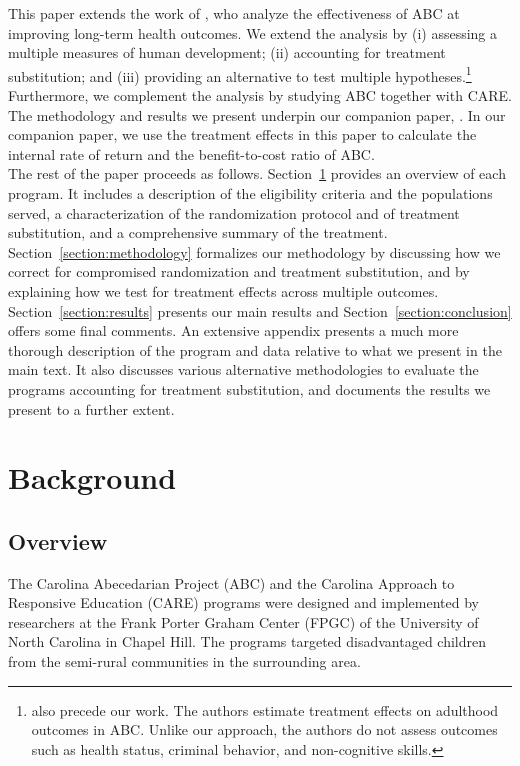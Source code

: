 \noindent This paper extends the work of \citet{Campbell_Conti_etal_2014_EarlyChildhoodInvestments}, who analyze the effectiveness of ABC at improving long-term health outcomes. We extend the analysis by (i) assessing a multiple measures of human development; (ii) accounting for treatment substitution; and (iii) providing an alternative to test multiple hypotheses.\footnote{\cite{Campbell_Pungello_etal_2012_DP} also precede our work. The authors estimate treatment effects on adulthood outcomes in ABC. Unlike our approach, the authors do not assess outcomes such as health status, criminal behavior, and non-cognitive skills.} Furthermore, we complement the analysis by studying ABC together with CARE. The methodology and results we present underpin our companion paper, \citet{Elango_et_al_2015_ABC_unpublished}. In our companion paper, we use the treatment effects in this paper to calculate the internal rate of return and the benefit-to-cost ratio of ABC.\\

\noindent The rest of the paper proceeds as follows. Section~\ref{section:background} provides an overview of each program. It includes a description of the eligibility criteria and the populations served, a characterization of the randomization protocol and of treatment substitution, and a comprehensive summary of the treatment. Section~\ref{section:methodology} formalizes our methodology by discussing how we correct for compromised randomization and treatment substitution, and  by explaining how we test for treatment effects across multiple outcomes. Section~\ref{section:results} presents our main results and Section~\ref{section:conclusion} offers some final comments. An extensive appendix presents a much more thorough description of the program and data relative to what we present in the main text. It also discusses various alternative methodologies to evaluate the programs accounting for treatment substitution, and documents the results we present to a further extent.

\section{Background} \label{section:background}
\subsection{Overview}

\noindent The Carolina Abecedarian Project (ABC) and the Carolina Approach to Responsive Education (CARE) programs were designed and implemented by researchers at the Frank Porter Graham Center (FPGC) of the University of North Carolina in Chapel Hill. The programs targeted disadvantaged children from the semi-rural communities in the surrounding area.\\

